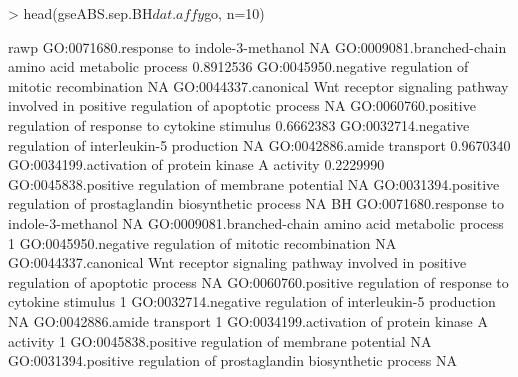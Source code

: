 \documentclass[11pt]{article}
\renewenvironment{Schunk}{\vspace{\topsep}}{\vspace{\topsep}}
\begin{document}
\begin{Schunk}
\begin{Sinput}
> head(gseABS.sep.BH$dat.affy$go, n=10)
\end{Sinput}
\begin{Soutput}
                                                                                                              rawp
GO:0071680.response to indole-3-methanol                                                                        NA
GO:0009081.branched-chain amino acid metabolic process                                                   0.8912536
GO:0045950.negative regulation of mitotic recombination                                                         NA
GO:0044337.canonical Wnt receptor signaling pathway involved in positive regulation of apoptotic process        NA
GO:0060760.positive regulation of response to cytokine stimulus                                          0.6662383
GO:0032714.negative regulation of interleukin-5 production                                                      NA
GO:0042886.amide transport                                                                               0.9670340
GO:0034199.activation of protein kinase A activity                                                       0.2229990
GO:0045838.positive regulation of membrane potential                                                            NA
GO:0031394.positive regulation of prostaglandin biosynthetic process                                            NA
                                                                                                         BH
GO:0071680.response to indole-3-methanol                                                                 NA
GO:0009081.branched-chain amino acid metabolic process                                                    1
GO:0045950.negative regulation of mitotic recombination                                                  NA
GO:0044337.canonical Wnt receptor signaling pathway involved in positive regulation of apoptotic process NA
GO:0060760.positive regulation of response to cytokine stimulus                                           1
GO:0032714.negative regulation of interleukin-5 production                                               NA
GO:0042886.amide transport                                                                                1
GO:0034199.activation of protein kinase A activity                                                        1
GO:0045838.positive regulation of membrane potential                                                     NA
GO:0031394.positive regulation of prostaglandin biosynthetic process                                     NA

\end{Soutput}
\end{Schunk}
\end{document}
